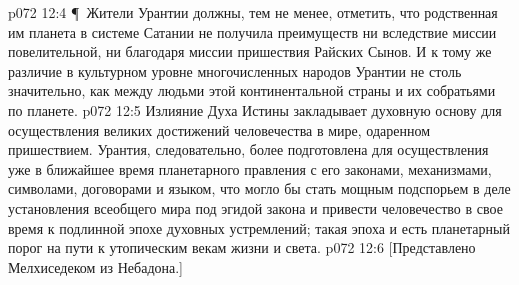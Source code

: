 \vs p072 12:4 \P\ Жители Урантии должны, тем не менее, отметить, что родственная им планета в системе Сатании не получила преимуществ ни вследствие миссии повелительной, ни благодаря миссии пришествия Райских Сынов. И к тому же различие в культурном уровне многочисленных народов Урантии не столь значительно, как между людьми этой континентальной страны и их собратьями по планете.
\vs p072 12:5 Излияние Духа Истины закладывает духовную основу для осуществления великих достижений человечества в мире, одаренном пришествием. Урантия, следовательно, более подготовлена для осуществления уже в ближайшее время планетарного правления с его законами, механизмами, символами, договорами и языком, что могло бы стать мощным подспорьем в деле установления всеобщего мира под эгидой закона и привести человечество в свое время к подлинной эпохе духовных устремлений; такая эпоха и есть планетарный порог на пути к утопическим векам жизни и света.
\vs p072 12:6 [Представлено Мелхиседеком из Небадона.]
